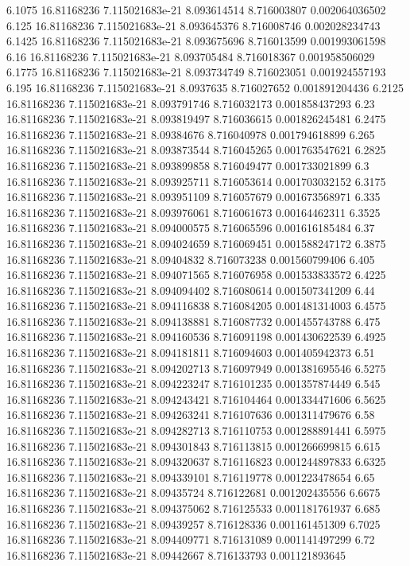 {6.1075 16.81168236 7.115021683e-21 8.093614514 8.716003807 0.002064036502
6.125 16.81168236 7.115021683e-21 8.093645376 8.716008746 0.002028234743
6.1425 16.81168236 7.115021683e-21 8.093675696 8.716013599 0.001993061598
6.16 16.81168236 7.115021683e-21 8.093705484 8.716018367 0.001958506029
6.1775 16.81168236 7.115021683e-21 8.093734749 8.716023051 0.001924557193
6.195 16.81168236 7.115021683e-21 8.0937635 8.716027652 0.001891204436
6.2125 16.81168236 7.115021683e-21 8.093791746 8.716032173 0.001858437293
6.23 16.81168236 7.115021683e-21 8.093819497 8.716036615 0.001826245481
6.2475 16.81168236 7.115021683e-21 8.09384676 8.716040978 0.001794618899
6.265 16.81168236 7.115021683e-21 8.093873544 8.716045265 0.001763547621
6.2825 16.81168236 7.115021683e-21 8.093899858 8.716049477 0.001733021899
6.3 16.81168236 7.115021683e-21 8.093925711 8.716053614 0.001703032152
6.3175 16.81168236 7.115021683e-21 8.093951109 8.716057679 0.001673568971
6.335 16.81168236 7.115021683e-21 8.093976061 8.716061673 0.00164462311
6.3525 16.81168236 7.115021683e-21 8.094000575 8.716065596 0.001616185484
6.37 16.81168236 7.115021683e-21 8.094024659 8.716069451 0.001588247172
6.3875 16.81168236 7.115021683e-21 8.09404832 8.716073238 0.001560799406
6.405 16.81168236 7.115021683e-21 8.094071565 8.716076958 0.001533833572
6.4225 16.81168236 7.115021683e-21 8.094094402 8.716080614 0.001507341209
6.44 16.81168236 7.115021683e-21 8.094116838 8.716084205 0.001481314003
6.4575 16.81168236 7.115021683e-21 8.094138881 8.716087732 0.001455743788
6.475 16.81168236 7.115021683e-21 8.094160536 8.716091198 0.001430622539
6.4925 16.81168236 7.115021683e-21 8.094181811 8.716094603 0.001405942373
6.51 16.81168236 7.115021683e-21 8.094202713 8.716097949 0.001381695546
6.5275 16.81168236 7.115021683e-21 8.094223247 8.716101235 0.001357874449
6.545 16.81168236 7.115021683e-21 8.094243421 8.716104464 0.001334471606
6.5625 16.81168236 7.115021683e-21 8.094263241 8.716107636 0.001311479676
6.58 16.81168236 7.115021683e-21 8.094282713 8.716110753 0.001288891441
6.5975 16.81168236 7.115021683e-21 8.094301843 8.716113815 0.001266699815
6.615 16.81168236 7.115021683e-21 8.094320637 8.716116823 0.001244897833
6.6325 16.81168236 7.115021683e-21 8.094339101 8.716119778 0.001223478654
6.65 16.81168236 7.115021683e-21 8.09435724 8.716122681 0.001202435556
6.6675 16.81168236 7.115021683e-21 8.094375062 8.716125533 0.001181761937
6.685 16.81168236 7.115021683e-21 8.09439257 8.716128336 0.001161451309
6.7025 16.81168236 7.115021683e-21 8.094409771 8.716131089 0.001141497299
6.72 16.81168236 7.115021683e-21 8.09442667 8.716133793 0.001121893645
}
